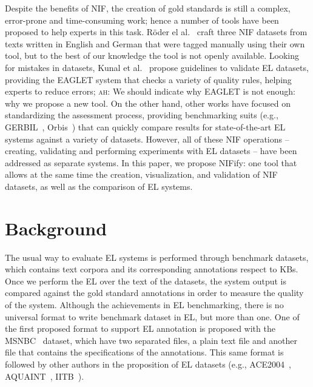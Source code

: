 \documentclass[sigconf]{acmart}
\newcommand{\ah}[1]{{\color{blue}\textsc{ah:} #1}}
\begin{document}
Despite the benefits of NIF, the creation of gold standards is still a complex, error-prone and time-consuming work; hence a number of tools have been proposed to help experts in this task. R\"oder el al.~\cite{N3} craft three NIF datasets from texts written in English and German that were tagged manually using their own tool, but to the best of our knowledge the tool is not openly available. Looking for mistakes in datasets, Kunal et al.~\cite{Kunal2017} propose guidelines to validate EL datasets, providing the EAGLET system that checks a variety of quality rules, helping experts to reduce errors; \ah{We should indicate why EAGLET is not enough: why we propose a new tool}. On the other hand, other works have focused on standardizing the assessment process, providing benchmarking suits (e.g., GERBIL~\cite{gerbil-2015}, Orbis~\cite{Orbis2018}) that can quickly compare results for state-of-the-art EL systems against a variety of datasets. However, all of these NIF operations -- creating, validating and performing experiments with EL datasets -- have been addressed as separate systems. In this paper, we propose NIFify: one tool that allows at the same time the creation, visualization, and validation of NIF datasets, as well as the comparison of EL systems. 





\section{Background}
\label{sec:nif}


The usual way to evaluate EL systems is performed through benchmark datasets, which contains text corpora and its corresponding annotations respect to KBs. Once we perform the EL over the text of the datasets, the system output is compared against the gold standard annotations in order to measure the quality of the system. Although the achievements in EL benchmarking, there is no universal format to write benchmark dataset in EL, but more than one. One of the first proposed format to support EL annotation is proposed with the MSNBC~\cite{cucerzan2007large} dataset, which have two separated files, a plain text file and another file that contains the specifications of the annotations. This same format is followed by other authors in the proposition of EL datasets (e.g., ACE2004~\cite{aquaint}, AQUAINT~\cite{aquaint}, IITB~\cite{IITB2009}). 
\end{document}
